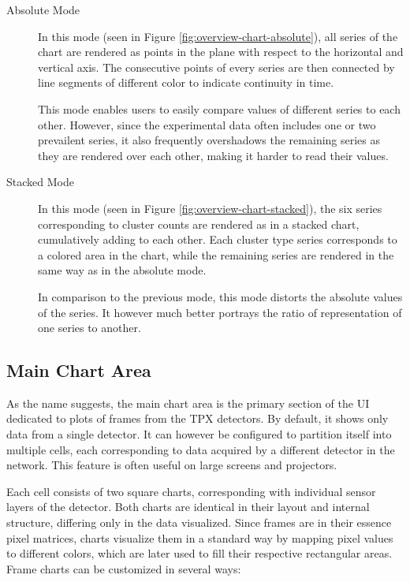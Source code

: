 \begin{description}
	\item[Absolute Mode]
	In this mode (seen in Figure \ref{fig:overview-chart-absolute}), all series of the chart are rendered as points in the plane with respect to the horizontal and vertical axis. The consecutive points of every series are then connected by line segments of different color to indicate continuity in time.

	This mode enables users to easily compare values of different series to each other. However, since the experimental data often includes one or two prevailent series, it also frequently overshadows the remaining series as they are rendered over each other, making it harder to read their values.

	\item[Stacked Mode]
	In this mode (seen in Figure \ref{fig:overview-chart-stacked}), the six series corresponding to cluster counts are rendered as in a stacked chart, cumulatively adding to each other. Each cluster type series corresponds to a colored area in the chart, while the remaining series are rendered in the same way as in the absolute mode.

	In comparison to the previous mode, this mode distorts the absolute values of the series. It however much better portrays the ratio of representation of one series to another.
\end{description}

\subsection{Main Chart Area}
As the name suggests, the main chart area is the primary section of the UI dedicated to plots of frames from the TPX detectors. By default, it shows only data from a single detector. It can however be configured to partition itself into multiple cells, each corresponding to data acquired by a different detector in the network. This feature is often useful on large screens and projectors.

Each cell consists of two square charts, corresponding with individual sensor layers of the detector. Both charts are identical in their layout and internal structure, differing only in the data visualized. Since frames are in their essence pixel matrices, charts visualize them in a standard way by mapping pixel values to different colors, which are later used to fill their respective rectangular areas. Frame charts can be customized in several ways:

